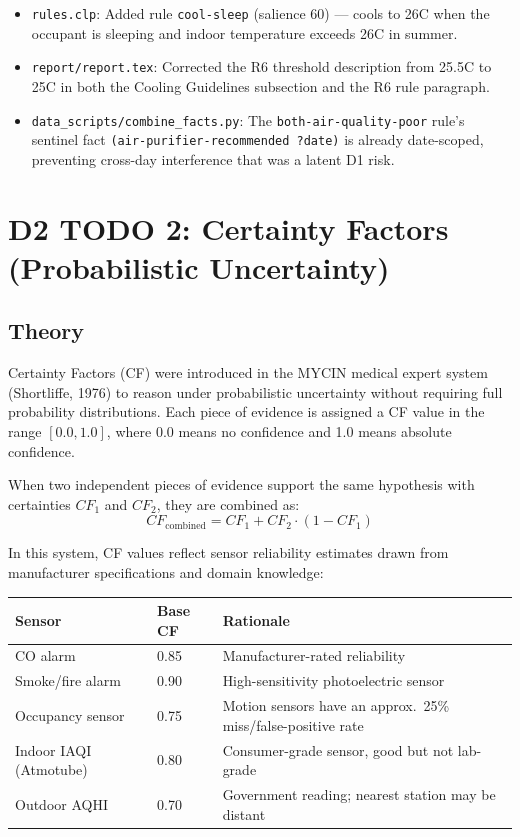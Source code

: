 \documentclass{article}
\begin{document}
\begin{itemize}
    \item \texttt{rules.clp}: Added rule \texttt{cool-sleep} (salience 60) — cools to 26\textdegree C when the occupant is sleeping and indoor temperature exceeds 26\textdegree C in summer.
    \item \texttt{report/report.tex}: Corrected the R6 threshold description from 25.5\textdegree C to 25\textdegree C in both the Cooling Guidelines subsection and the R6 rule paragraph.
    \item \texttt{data\_scripts/combine\_facts.py}: The \texttt{both-air-quality-poor} rule's sentinel fact \texttt{(air-purifier-recommended ?date)} is already date-scoped, preventing cross-day interference that was a latent D1 risk.
\end{itemize}



\section{D2 TODO 2: Certainty Factors (Probabilistic Uncertainty)}

\subsection{Theory}

Certainty Factors (CF) were introduced in the MYCIN medical expert system (Shortliffe, 1976) to reason under probabilistic uncertainty without requiring full probability distributions. Each piece of evidence is assigned a CF value in the range $[0.0, 1.0]$, where 0.0 means no confidence and 1.0 means absolute confidence.

When two independent pieces of evidence support the same hypothesis with certainties $CF_1$ and $CF_2$, they are combined as:
\[
CF_{\text{combined}} = CF_1 + CF_2 \cdot (1 - CF_1)
\]

In this system, CF values reflect sensor reliability estimates drawn from manufacturer specifications and domain knowledge:

\begin{center}
\begin{tabular}{lll}
\hline
Sensor & Base CF & Rationale \\
\hline
CO alarm & 0.85 & Manufacturer-rated reliability \cite{co_detector_standard} \\
Smoke/fire alarm & 0.90 & High-sensitivity photoelectric sensor \\
Occupancy sensor & 0.75 & Motion sensors have an approx.\ 25\% miss/false-positive rate \\
Indoor IAQI (Atmotube) & 0.80 & Consumer-grade sensor, good but not lab-grade \\
Outdoor AQHI & 0.70 & Government reading; nearest station may be distant \\
\hline
\end{tabular}
\end{center}
\end{document}
